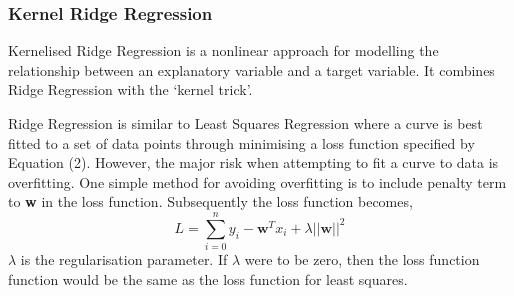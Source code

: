 \documentclass[a4paper,11pt,twoside]{article}
\begin{document}
\subsubsection{Kernel Ridge Regression}
Kernelised Ridge Regression is a nonlinear approach for modelling the relationship between an explanatory variable and a target variable. It combines Ridge Regression with the `kernel trick'.

Ridge Regression is similar to Least Squares Regression where a curve is best fitted to a set of data points through minimising a loss function specified by Equation (2). However, the major risk when attempting to fit a curve to data is overfitting. One simple method for avoiding overfitting is to include penalty term to \textbf{w} in the loss function. Subsequently the loss function becomes, 
\begin{equation}
L = \sum_{i=0}^{n}y_{i} - \textbf{w}^Tx_{i} + \lambda||\textbf{w}||^2
\end{equation}
$\lambda$ is the regularisation parameter. If $\lambda$ were to be zero, then the loss function function would be the same as the loss function for least squares.
\end{document}

